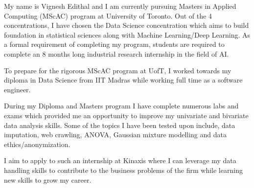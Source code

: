 \documentclass{resume}
\begin{document}
My name is Vignesh Edithal and I am currently pursuing Masters in Applied Computing (MScAC) program at University of Toronto.
Out of the 4 concentrations, I have chosen the Data Science concentration which aims to build foundation
in statistical sciences along with Machine Learning/Deep Learning. As a formal requirement of completing my program,
students are required to complete an 8 months long industrial research internship in the field of AI.

To prepare for the rigorous MScAC program at UofT, I worked towards my diploma in Data Science from IIT Madras while working full time as a software engineer.

During my Diploma and Masters program I have complete numerous labs and exams which provided me an opportunity to improve my univariate and bivariate data analysis skills. Some of the topics I have been tested upon include, data imputation, web crawling, ANOVA, Gaussian mixture modelling and data ethics/anonymization.

I aim to apply to such an internship at Kinaxis where I can leverage my data handling skills to contribute to the business problems of the firm while learning new skills to grow my career.
\end{document}
